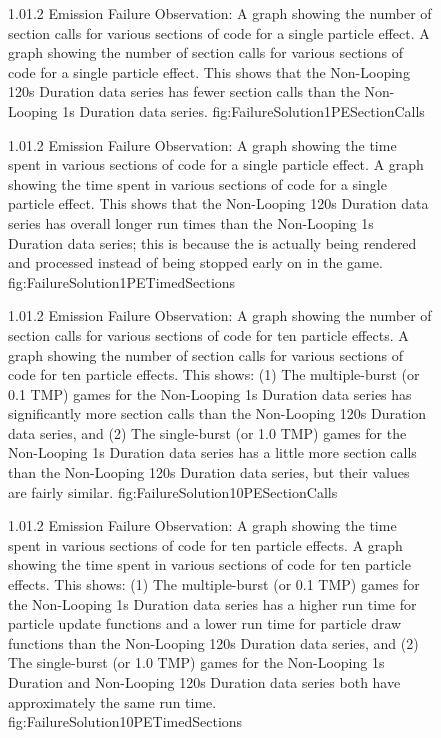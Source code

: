 \begin{figure}
\addtocounter{figure}{-1}

	\vspace{-1.5cm}
	{1.0}{1.2}
	{Emission Failure Observation: A graph showing the number of section calls for various sections of code for a single particle effect.}
	{A graph showing the number of section calls for various sections of code for a single particle effect. This shows that the Non-Looping 120s Duration data series has fewer section calls than the Non-Looping 1s Duration data series.}
	{fig:FailureSolution1PESectionCalls}

	{1.0}{1.2}
	{Emission Failure Observation: A graph showing the time spent in various sections of code for a single particle effect.}
	{A graph showing the time spent in various sections of code for a single particle effect. This shows that the Non-Looping 120s Duration data series has overall longer run times than the Non-Looping 1s Duration data series; this is because the  is actually being rendered and processed instead of being stopped early on in the game.}
	{fig:FailureSolution1PETimedSections}

\end{figure}

\begin{figure}
\addtocounter{figure}{-1}

	\vspace{-1.5cm}
	{1.0}{1.2}
	{Emission Failure Observation: A graph showing the number of section calls for various sections of code for ten particle effects.}
	{A graph showing the number of section calls for various sections of code for ten particle effects. This shows: (1) The multiple-burst (or 0.1 TMP) games for the Non-Looping 1s Duration data series has significantly more section calls than the Non-Looping 120s Duration data series, and (2) The single-burst (or 1.0 TMP) games for the Non-Looping 1s Duration data series has a little more section calls than the Non-Looping 120s Duration data series, but their values are fairly similar. }
	{fig:FailureSolution10PESectionCalls}

	{1.0}{1.2}
	{Emission Failure Observation: A graph showing the time spent in various sections of code for ten particle effects.}
	{A graph showing the time spent in various sections of code for ten particle effects. This shows: (1) The multiple-burst (or 0.1 TMP) games for the Non-Looping 1s Duration data series has a higher run time for particle update functions and a lower run time for particle draw functions than the Non-Looping 120s Duration data series, and (2) The single-burst (or 1.0 TMP) games for the Non-Looping 1s Duration and Non-Looping 120s Duration data series both have approximately the same run time. }
	{fig:FailureSolution10PETimedSections}

\end{figure}


